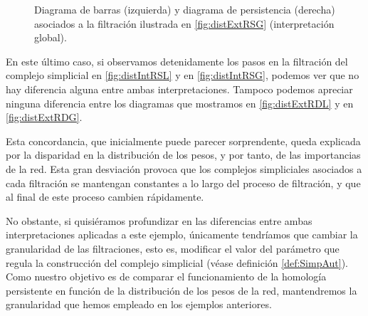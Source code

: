 \documentclass[12pt, a4paper, twoside]{book}
\numberwithin{equation}{section}
\theoremstyle{definition}
\newenvironment{ejem}
  {\pushQED{\qed}\renewcommand{\qedsymbol}{$\blacktriangleleft$}\ejemplo}
  {\popQED\endejemplo}
\theoremstyle{remark}
\theoremstyle{plain}
\begin{document}
\begin{ejem}
\begin{figure}[!htbp]
\begin{figure}[H]
			\end{figure}
		\endminipage
		\caption{Diagrama de barras (izquierda) y diagrama de 
		persistencia (derecha) asociados a la filtración ilustrada en 
		\ref{fig:distExtRSG} (interpretación global).}
		\label{fig:distExtRDG}
	\end{figure}

	En este último caso, si observamos detenidamente los pasos en la 
	filtración del complejo simplicial en \autoref{fig:distIntRSL} y en 
	\autoref{fig:distIntRSG}, podemos ver que no hay diferencia alguna 
	entre ambas interpretaciones. Tampoco podemos apreciar ninguna 
	diferencia entre los diagramas que mostramos en 
	\autoref{fig:distExtRDL} y en \autoref{fig:distExtRDG}.

	Esta concordancia, que inicialmente puede parecer sorprendente, 
	queda explicada por la disparidad en la distribución de los pesos, y 
	por tanto, de las importancias de la red. Esta gran desviación provoca 
	que los complejos simpliciales asociados a cada filtración se 
	mantengan constantes a lo largo del proceso de filtración, y que al 
	final de este proceso cambien rápidamente.

	No obstante, si quisiéramos profundizar en las diferencias entre ambas 
	interpretaciones aplicadas a este ejemplo, únicamente tendríamos que 
	cambiar la 
	granularidad de las filtraciones, esto es, modificar el valor del 
	parámetro que regula la construcción del complejo simplicial (véase 
	definición \ref{def:SimpAut}). Como nuestro objetivo es de 
	comparar el funcionamiento de la homología persistente en función de 
	la distribución de los pesos de la red, mantendremos la granularidad 
	que hemos empleado en los ejemplos anteriores.
	\end{ejem}
\end{document}
